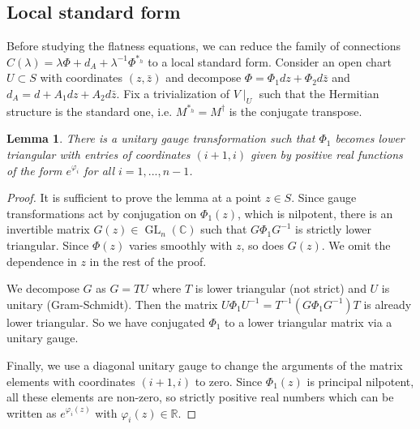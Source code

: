 \documentclass[11pt]{amsart}
\newtheorem{lemma}[thm]{Lemma}
\numberwithin{thm}{section} %
\numberwithin{equation}{section} %
\numberwithin{figure}{section} %
\newcommand*{\R}{\mathbb{R}}
\newcommand*{\C}{\mathbb{C}}
\renewcommand*{\l}{\lambda}
\DeclareMathOperator{\GL}{GL}
\begin{document}





\subsection{Local standard form}\label{standard-form}

Before studying the flatness equations, we can reduce the family of connections $C(\l)=\l\Phi + d_A + \l^{-1}\Phi^{*_h}$ to a local standard form. Consider an open chart $U\subset S$ with coordinates $(z,\bar{z})$ and decompose $\Phi=\Phi_1dz+\Phi_2d\bar{z}$ and $d_A=d+A_1dz+A_2d\bar{z}$. Fix a trivialization of $V\!\mid_U$ such that the Hermitian structure is the standard one, i.e. $M^{*_h}=M^\dagger$ is the conjugate transpose.

\begin{lemma}\label{phi1lower}
There is a unitary gauge transformation such that $\Phi_1$ becomes lower triangular with entries of coordinates $(i+1,i)$ given by positive real functions of the form $e^{\varphi_i}$ for all $i=1,...,n-1$.
\end{lemma}
\begin{proof}
It is sufficient to prove the lemma at a point $z\in S$.
Since gauge transformations act by conjugation on $\Phi_1(z)$, which is nilpotent, there is an invertible matrix $G(z)\in \GL_n(\C)$ such that $G\Phi_1G^{-1}$ is strictly lower triangular. Since $\Phi(z)$ varies smoothly with $z$, so does $G(z)$. We omit the dependence in $z$ in the rest of the proof.

We decompose $G$ as $G=TU$ where $T$ is lower triangular (not strict) and $U$ is unitary (Gram-Schmidt). Then the matrix $U\Phi_1U^{-1} = T^{-1}(G\Phi_1G^{-1})T$ is already lower triangular. So we have conjugated $\Phi_1$ to a lower triangular matrix via a unitary gauge.

Finally, we use a diagonal unitary gauge to change the arguments of the matrix elements with coordinates $(i+1,i)$ to zero. Since $\Phi_1(z)$ is principal nilpotent, all these elements are non-zero, so strictly positive real numbers which can be written as $e^{\varphi_i(z)}$ with $\varphi_i(z) \in \R$.
\end{proof}
\end{document}
